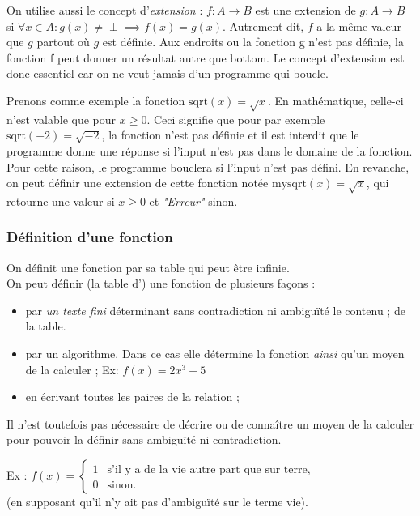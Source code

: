 On utilise aussi le concept d'\emph{extension} :
$f \colon A \rightarrow B$ est une extension de $g \colon A \rightarrow B$ si $\forall x \in A : g(x)\neq \perp \implies f(x) = g(x)$.
Autrement dit, $f$ a la même valeur que $g$ partout où $g$ est définie. Aux endroits ou la fonction g n'est pas définie, la fonction f peut donner un résultat autre que bottom. Le concept d'extension est donc essentiel car on ne veut jamais d'un programme qui boucle.

Prenons comme exemple la fonction $\mathrm{sqrt}(x) = \sqrt{x}$. En mathématique, celle-ci n'est valable que pour $x\geq0$. Ceci signifie que pour par exemple $\mathrm{sqrt}(-2) = \sqrt{-2}$, la fonction n'est pas définie et il est interdit que le programme donne une réponse si l'input n'est pas dans le domaine de la fonction. Pour cette raison, le programme bouclera si l'input n'est pas défini. En revanche, on peut définir une extension de cette fonction notée $\mathrm{mysqrt}(x) = \sqrt{x}$, qui retourne une valeur si $x\geq0$ et \textit{"Erreur"} sinon.

\subsubsection{Définition d'une fonction}
\label{par:d_finition_d_une_fonciton}
On définit une fonction par sa table qui peut être infinie.\\
On peut définir (la table d') une fonction de plusieurs façons :
\begin{itemize}
	\item par \emph{un texte fini} déterminant sans contradiction ni ambiguïté le contenu ;
		de la table.
	\item par un algorithme. Dans ce cas elle détermine la fonction \textit{ainsi} qu'un moyen de la calculer ;
		\subitem Ex: $f(x) = 2x^3+5$
	\item en écrivant toutes les paires de la relation ;
\end{itemize}
Il n'est toutefois pas nécessaire de décrire ou de connaître un moyen de la calculer
pour pouvoir la définir sans ambiguïté ni contradiction.

Ex : $f(x) = \left\{\begin{array}{ll} 1 & \text{s'il y a de la vie autre part que sur terre,} \\ 0 & \text{sinon.}\end{array}\right.$\\(en supposant qu'il n'y ait pas d'ambiguïté sur le terme \og vie\fg).\\

